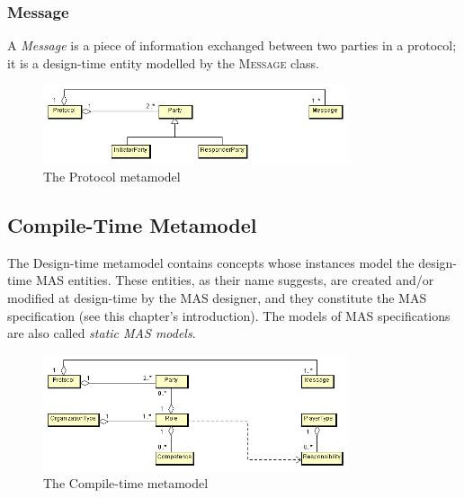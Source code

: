 \subsubsection*{Message}

A \textit{Message} is a piece of information exchanged between two parties in a protocol; it is a design-time entity modelled by the \textsc{Message} class.

\begin{figure}[ht]
	\centering
	\includegraphics[width=0.8\textwidth]{images/thespian/protocol-metamodel.png}
	\caption{The Protocol metamodel}
	\label{figure:thespian-protocol-metamodel}
\end{figure}

\subsection{Compile-Time Metamodel}	

The Design-time metamodel contains concepts whose instances model the design-time MAS entities.
These entities, as their name suggests, are created and/or modified at design-time by the MAS designer, and they constitute the MAS specification (see this chapter's introduction).
The models of MAS specifications are also called \textit{static MAS models}.

\begin{figure}[ht]
	\centering
	\includegraphics[width=0.8\textwidth]{images/thespian/compile-time-metamodel.png}
	\caption{The Compile-time metamodel}
	\label{figure:thespian-static-metamodel}
\end{figure}

